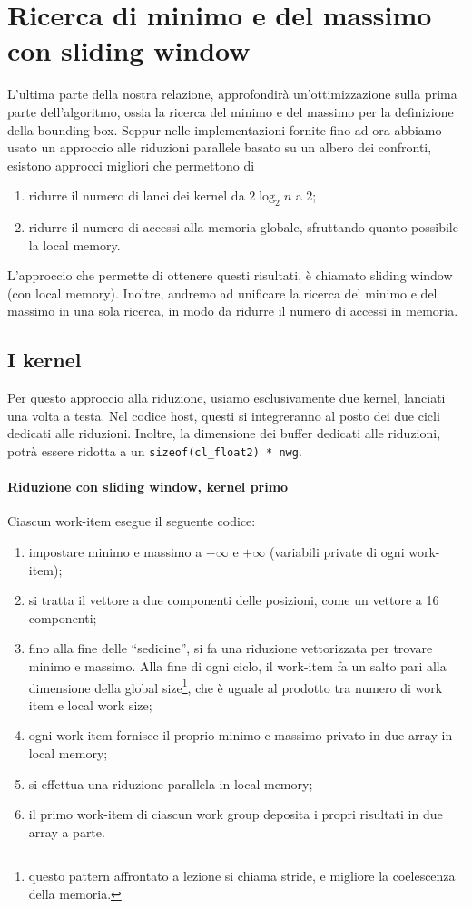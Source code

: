 \documentclass{article}
\begin{document}
\section{Ricerca di minimo e del massimo con sliding window}
L'ultima parte della nostra relazione, approfondirà un'ottimizzazione sulla prima parte dell'algoritmo, ossia la ricerca del minimo e del massimo per la definizione della bounding box. 
Seppur nelle implementazioni fornite fino ad ora abbiamo usato un approccio alle riduzioni parallele basato su un albero dei confronti, esistono approcci migliori che permettono di
	\begin{enumerate}
		\item ridurre il numero di lanci dei kernel da $2\log_2n$ a 2;
		\item ridurre il numero di accessi alla memoria globale, sfruttando quanto possibile la local memory.
	\end{enumerate}
	L'approccio che permette di ottenere questi risultati, è chiamato sliding window (con local memory). Inoltre, andremo ad unificare la ricerca del minimo e del massimo in una sola ricerca, in modo da ridurre il numero di accessi in memoria.
	
	\subsection{I kernel}
	Per questo approccio alla riduzione, usiamo esclusivamente due kernel, lanciati una volta a testa. Nel codice host, questi si integreranno al posto dei due cicli dedicati alle riduzioni. Inoltre, la dimensione dei buffer dedicati alle riduzioni, potrà essere ridotta a un \verb|sizeof(cl_float2) * nwg|.
	
	\paragraph{Riduzione con sliding window, kernel primo} 
	Ciascun work-item esegue il seguente codice:
	\begin{enumerate}
		\item impostare minimo e massimo a $-\infty$  e $+\infty$ (variabili private di ogni work-item);
		\item si tratta il vettore a due componenti delle posizioni, come un vettore a 16 componenti;
		\item fino alla fine delle ``sedicine'', si fa una riduzione vettorizzata per trovare minimo e massimo. Alla fine di ogni ciclo, il work-item fa un salto pari alla dimensione della global size\footnote{questo pattern affrontato a lezione si chiama stride, e migliore la coelescenza della memoria.}, che è uguale al prodotto tra numero di work item e local work size;
		\item ogni work item fornisce il proprio minimo e massimo privato in due array in local memory;
		\item si effettua una riduzione parallela in local memory;
		\item il primo work-item di ciascun work group deposita i propri risultati in due array a parte.
	\end{enumerate}
	
\end{document}
